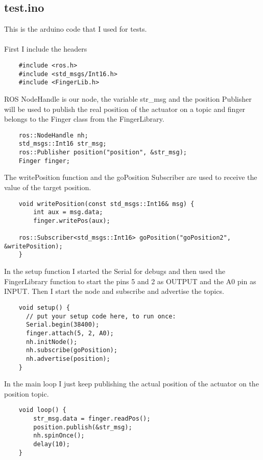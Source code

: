 \documentclass{article}
\begin{document}
\subsection{test.ino}
This is the arduino code that I used for tests.\\\\   
First I include the headers
\begin{verbatim}
    #include <ros.h>
    #include <std_msgs/Int16.h>
    #include <FingerLib.h>
\end{verbatim}
ROS NodeHandle is our node, the variable str\_msg and the position Publisher will be used to publish the real position of the actuator on a topic and finger belongs to the Finger class from the FingerLibrary.
\begin{verbatim}
    ros::NodeHandle nh;
    std_msgs::Int16 str_msg;
    ros::Publisher position("position", &str_msg);
    Finger finger;
\end{verbatim}
The writePosition function and the goPosition Subscriber are used to receive the value of the target position.
\begin{verbatim}
    void writePosition(const std_msgs::Int16& msg) {
        int aux = msg.data;
        finger.writePos(aux);

    ros::Subscriber<std_msgs::Int16> goPosition("goPosition2", &writePosition);
    }
\end{verbatim}
In the setup function I started the Serial for debugs and then used the FingerLibrary function to start the pins 5 and 2 as OUTPUT and the A0 pin as INPUT. Then I start the node and subscribe and advertise the topics. 
\begin{verbatim}
    void setup() {
      // put your setup code here, to run once:
      Serial.begin(38400);
      finger.attach(5, 2, A0);
      nh.initNode();
      nh.subscribe(goPosition);
      nh.advertise(position);
    }
\end{verbatim}
In the main loop I just keep publishing the actual position of the actuator on the position topic.
\begin{verbatim}
    void loop() {
        str_msg.data = finger.readPos();
        position.publish(&str_msg);
        nh.spinOnce();
        delay(10);
    }
\end{verbatim}
\end{document}
